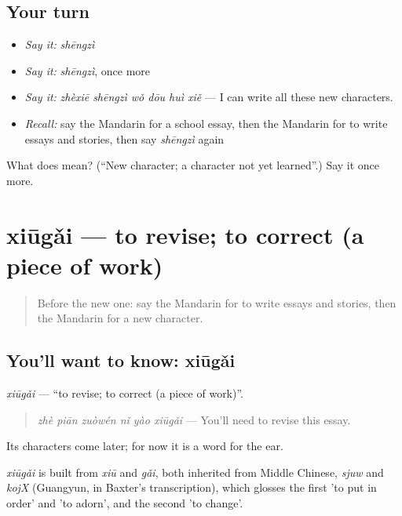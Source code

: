 \subsection*{Your turn}
\begin{itemize}
\raggedright
  \item \emph{Say it:} \emph{shēngzì}
  \item \emph{Say it:} \emph{shēngzì}, once more
  \item \emph{Say it:} \emph{zhèxiē shēngzì wǒ dōu huì xiě} — I can write all these new characters.
  \item \emph{Recall:} say the Mandarin for a school essay, then the Mandarin for to write essays and stories, then say \emph{shēngzì} again
\end{itemize}

\begin{tcolorbox}[breakable,colback=teal!4,colframe=teal!35!black,title={Before you move on}]
What does  mean? (\textquotedblleft{}New character; a character not yet learned\textquotedblright{}.) Say it once more.
\end{tcolorbox}
\section[xiūgǎi]{xiūgǎi — to revise; to correct (a piece of work)}

\label{lesson:ZH-C251-xiugai}



\begin{quote}
Before the new one: say the Mandarin for to write essays and stories, then the Mandarin for a new character.
\end{quote}

\subsection*{You'll want to know: xiūgǎi}
\emph{xiūgǎi} — \textquotedblleft{}to revise; to correct (a piece of work)\textquotedblright{}.

\begin{quote}
\emph{zhè piān zuòwén nǐ yào xiūgǎi} — You'll need to revise this essay.
\end{quote}

Its characters come later; for now it is a word for the ear.

\begin{cousinweb}
\emph{xiūgǎi} is built from \emph{xiū} and \emph{gǎi}, both inherited from Middle Chinese, \emph{sjuw} and \emph{kojX} (Guangyun, in Baxter's transcription), which glosses the first 'to put in order' and 'to adorn', and the second 'to change'.
\end{cousinweb}

